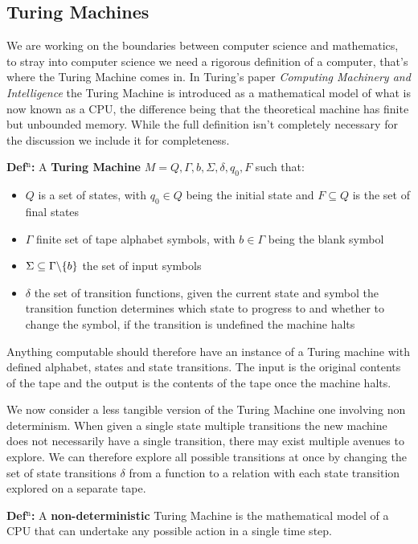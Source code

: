 \documentclass[a4paper,11pt]{report}
\begin{document}
\subsection{Turing Machines}

We are working on the boundaries between computer science and mathematics, to stray into computer science we need a rigorous definition of a computer, that's where the Turing Machine comes in. In Turing's paper \textit{Computing Machinery and Intelligence} \cite{turing} the Turing Machine is introduced as a mathematical model of what is now known as a CPU, the difference being that the theoretical machine has finite but unbounded memory. While the full definition isn't completely necessary for the discussion we include it for completeness.

\textbf{Def$^\text{n}$:} A \textbf{Turing Machine} $M={Q,\Gamma,b,\Sigma, \delta, q_0, F}$ such that:
\begin{itemize}
\item $Q$ is a set of states, with $q_0\in Q$ being the initial state and $F\subseteq Q$ is the set of final states
\item $\Gamma$ finite set of tape alphabet symbols, with $b\in \Gamma$ being the blank symbol
\item $\Sigma\subseteq \Gamma \symbol{92} \{b\}$ the set of input symbols
\item $\delta$ the set of transition functions, given the current state and symbol the transition function determines which state to progress to and whether to change the symbol, if the transition is undefined the machine halts
\end{itemize}

Anything computable should therefore have an instance of a Turing machine with defined alphabet, states and state transitions. The input is the original contents of the tape and the output is the contents of the tape once the machine halts. 

We now consider a less tangible version of the Turing Machine one involving non determinism. When given a single state multiple transitions the new machine does not necessarily have a single transition, there may exist multiple avenues to explore. We can therefore explore all possible transitions at once by changing the set of state transitions $\delta$ from a function to a relation with each state transition explored on a separate tape. 

\textbf{Def$^\text{n}$:} A \textbf{non-deterministic} Turing Machine is the mathematical model of a CPU that can undertake any possible action in a single time step.
\end{document}
